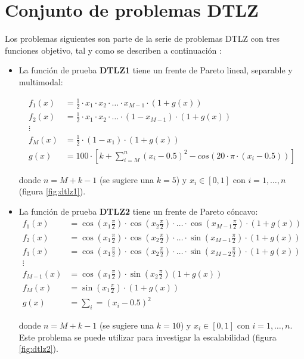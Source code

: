 \section{Conjunto de problemas DTLZ} 

Los problemas siguientes son parte de la serie de problemas DTLZ con tres funciones objetivo, tal y como se describen a continuaci\'on 
\cite{dtlz2002a}:

\begin{itemize}
\item La funci\'on de prueba \textbf{DTLZ1} tiene un frente de Pareto lineal, separable y multimodal:

\begin{align*}
f_1(x)&=\frac{1}{2}\cdot x_1\cdot x_2 \cdot \ldots \cdot x_{M-1} \cdot (1+g(x))\\
f_2(x)&=\frac{1}{2}\cdot x_1\cdot x_2 \cdot \ldots \cdot(1-x_{M-1})\cdot(1+g(x))\\
\vdots&\\
f_M(x)&=\frac{1}{2}\cdot(1-x_1)\cdot(1+g(x))\\
g(x)&=100\cdot[k+\sum_{i=M}^n(x_i-0.5)^2-cos(20\cdot\pi\cdot(x_i-0.5))]
\end{align*}

donde $n=M+k-1$ (se sugiere una $k=5$) y $x_i\in[0,1]$ con $i = 1, \ldots, n$ (figura \ref{fig:dtlz1}).


 \item La funci\'on de prueba \textbf{DTLZ2} tiene un frente de Pareto c\'oncavo:
\begin{align*}
f_1(x)&=\cos(x_1\frac{\pi}{2})\cdot\cos(x_2\frac{\pi}{2})\cdot\ldots\cdot\cos(x_{M-1}\frac{\pi}{2})\cdot(1+g(x))\\
f_2(x)&=\cos(x_1\frac{\pi}{2})\cdot\cos(x_2\frac{\pi}{2})\cdot\ldots\cdot\sin(x_{M-1}\frac{\pi}{2})\cdot(1+g(x))\\
f_3(x)&=\cos(x_1\frac{\pi}{2})\cdot\cos(x_2\frac{\pi}{2})\cdot\ldots\cdot\sin(x_{M-2}\frac{\pi}{2})\cdot(1+g(x))\\
\vdots&\\
f_{M-1}(x)&=\cos(x_1\frac{\pi}{2})\cdot\sin(x_2\frac{\pi}{2})(1+g(x))\\
f_{M}(x)&=\sin(x_1\frac{\pi}{2})\cdot(1+g(x))\\
g(x)&=\sum_i=(x_i-0.5)^2
\end{align*}

donde $n=M+k-1$ (se sugiere una $k=10$) y $x_i\in[0,1]$ con $i= 1, \ldots, n$. Este problema se puede utilizar para investigar la 
escalabilidad (figura \ref{fig:dtlz2}).


\end{itemize}
